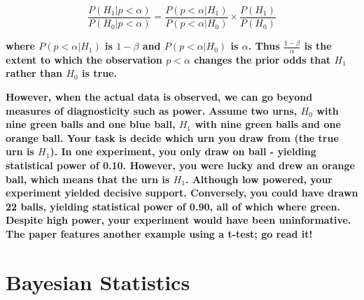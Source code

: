 \documentclass[12pt]{scrartcl}
\begin{document}
\begin{description}
  \begin{equation*}
    \frac{P(H_1 | p < \alpha)}{P(H_0 | p < \alpha)} = \frac{P(p < \alpha | H_1)}{P(p < \alpha | H_0)} \times \frac{P(H_1)}{P(H_0)}
  \end{equation*}
  
  \textbf{where $P(p < \alpha | H_1)$ is $1 - \beta$ and $P(p < \alpha | H_0)$ is $\alpha$. Thus $\frac{1 - \beta}{\alpha}$ is the extent to which the observation $p < \alpha$ changes the prior odds that $H_1$ rather than $H_0$ is true.}
  
  \textbf{However, when the actual data is observed, we can go beyond measures of diagnosticity such as power. Assume two urns, $H_0$ with nine green balls and one blue ball, $H_1$ with nine green balls and one orange ball. Your task is decide which urn you draw from (the true urn is $H_1$). In one experiment, you only draw on ball - yielding statistical power of 0.10. However, you were lucky and drew an orange ball, which means that the urn is $H_1$. Although low powered, your experiment yielded decisive support. Conversely, you could have drawn 22 balls, yielding statistical power of 0.90, all of which where green. Despite high power, your experiment would have been uninformative. The paper features another example using a t-test; go read it!}
\end{description}

\section{Bayesian Statistics}
\end{document}
